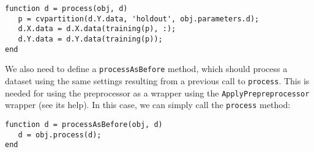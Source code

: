 \begin{lstlisting}
function d = process(obj, d)
   p = cvpartition(d.Y.data, 'holdout', obj.parameters.d);
   d.X.data = d.X.data(training(p), :);
   d.Y.data = d.Y.data(training(p));
end
\end{lstlisting}

\noindent We also need to define a \verb|processAsBefore| method, which should process a dataset using the same settings resulting from a previous call to \verb|process|. This is needed for using the preprocessor as a wrapper using the \verb|ApplyPrepreprocessor| wrapper (see its help). In this case, we can simply call the \verb|process| method:

\begin{lstlisting}
function d = processAsBefore(obj, d)
   d = obj.process(d);
end
\end{lstlisting}